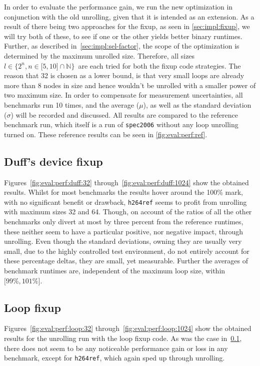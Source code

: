In order to evaluate the performance gain, we run the new optimization in conjunction with the old unrolling, given that it is intended as an extension.
As a result of there being two approaches for the fixup, as seen in \cref{sec:impl:fixup}, we will try both of these, to see if one or the other yields better binary runtimes.
Further, as described in~\cref{sec:impl:sel-factor}, the scope of the optimization is determined by the maximum unrolled size.
Therefore, all sizes~$l \in \{2^n, n \in \lbrack 5, 10 \rbrack \cap \mathbb{N}\}$~are each tried for both the fixup code strategies.
The reason that 32 is chosen as a lower bound, is that very small loops are already more than 8 nodes in size and hence wouldn't be unrolled with a smaller power of two maximum size.
In order to compensate for measurement uncertainties, all benchmarks run 10 times, and the average ($\mu$), as well as the standard deviation ($\sigma$) will be recorded and discussed.
All results are compared to the reference benchmark run, which itself is a run of \texttt{spec2006} without any loop unrolling turned on.
These reference results can be seen in \cref{fig:eval:perf:ref}.



\subsection{Duff's device fixup}\label{sec:eval:perf:duff}



Figures~\ref{fig:eval:perf:duff:32} through~\ref{fig:eval:perf:duff:1024} show the obtained results.
Whilst for most benchmarks the results hover around the 100\% mark, with no significant benefit or drawback, \texttt{h264ref} seems to profit from unrolling with maximum sizes 32 and 64.
Though, on account of the ratios of all the other benchmarks only divert at most by three percent from the reference runtimes, these neither seem to have a particular positive, nor negative impact, through unrolling.
Even though the standard deviations, owning they are usually very small, due to the highly controlled test environment, do not entirely account for these percentage deltas, they are small, yet measurable.
Further the averages of benchmark runtimes are, independent of the maximum loop size, within $\lbrack 99\%, 101\% \rbrack$.

\subsection{Loop fixup}\label{sec:eval:perf:loop}



Figures~\ref{fig:eval:perf:loop:32} through~\ref{fig:eval:perf:loop:1024} show the obtained results for the unrolling run with the loop fixup code.
As was the case in~\cref{sec:eval:perf:duff}, there does not seem to be any noticeable performance gain or loss in any benchmark, except for \texttt{h264ref}, which again sped up through unrolling.
